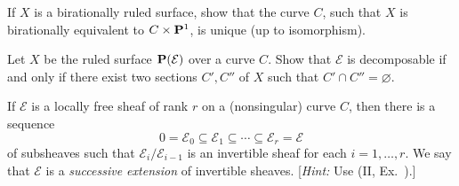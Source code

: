 {\Exercises
{\fontsize{9}{10.6}\selectfont\setlength{\parskip}{0pt}
\begin{description}[style=multiline,labelwidth=1.8em,leftmargin=2.15em,itemsep=3pt,topsep=0pt,parsep=0pt]
\item[\hypertarget{ex-V-2.1}{}2.1.] If $X$ is a birationally ruled surface, show that the curve $C$, such that $X$ is birationally equivalent to $C\times\mathbf{P}^1$, is unique (up to isomorphism).
\item[\hypertarget{ex-V-2.2}{}2.2.] Let $X$ be the ruled surface $\mathbf{P}(\mathcal E)$ over a curve $C$. Show that $\mathcal E$ is decomposable if and only if there exist two sections $C',C''$ of $X$ such that $C'\cap C''=\varnothing$.
\item[\hypertarget{ex-V-2.3}{}2.3.]
\begin{parts}
\item If $\mathcal E$ is a locally free sheaf of rank $r$ on a (nonsingular) curve $C$, then there is a sequence
\[
0=\mathcal E_0\subseteq\mathcal E_1\subseteq\cdots\subseteq\mathcal E_r=\mathcal E
\]
of subsheaves such that $\mathcal E_i/\mathcal E_{i-1}$ is an invertible sheaf for each $i=1,\ldots,r$. We say that $\mathcal E$ is a \emph{successive extension} of invertible sheaves. [\emph{Hint:} Use (II, Ex.~).]
\end{parts}
\end{description}
}
}
